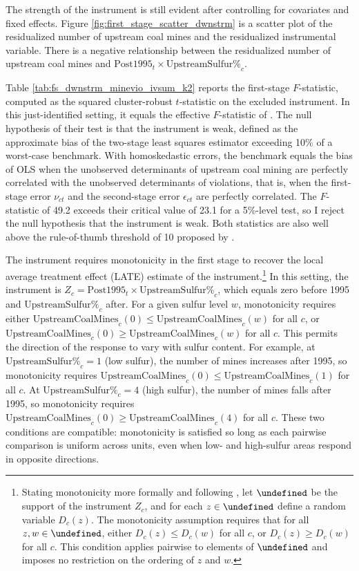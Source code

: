 \documentclass[12pt]{article}
\let\Psi\undefined
\begin{document}
The strength of the instrument is still evident after controlling for covariates and fixed effects. Figure \ref{fig:first_stage_scatter_dwnstrm} is a scatter plot of the residualized number of upstream coal mines and the residualized instrumental variable. There is a negative relationship between the residualized number of upstream coal mines and $\text{Post1995}_t \times \text{UpstreamSulfur\%}_c$.

Table \ref{tab:fs_dwnstrm_minevio_ivsum_k2} reports the first-stage $F$-statistic, computed as the squared cluster-robust $t$-statistic on the excluded instrument. In this just-identified setting, it equals the effective $F$-statistic of \textcite{montielolea2013robust}. The null hypothesis of their test is that the instrument is weak, defined as the approximate bias of the two-stage least squares estimator exceeding 10\% of a worst-case benchmark. With homoskedastic errors, the benchmark equals the bias of OLS when the unobserved determinants of upstream coal mining are perfectly correlated with the unobserved determinants of violations, that is, when the first-stage error $\nu_{ct}$ and the second-stage error $\epsilon_{ct}$ are perfectly correlated. The $F$-statistic of 49.2 exceeds their critical value of 23.1 for a 5\%-level test, so I reject the null hypothesis that the instrument is weak. Both statistics are also well above the rule-of-thumb threshold of 10 proposed by \textcite{staigerstock1997instrumental}.

The instrument requires monotonicity in the first stage to recover the local average treatment effect (LATE) estimate of the instrument.\footnote{Stating monotonicity more formally and following \textcite{angrist1994identification}, let $\Psi$ be the support of the instrument $Z_c$, and for each $z \in \Psi$ define a random variable $D_c(z)$. The monotonicity assumption requires that for all $z, w \in \Psi$, either $D_c(z) \leq D_c(w)$ for all $c$, or $D_c(z) \geq D_c(w)$ for all $c$. This condition applies pairwise to elements of $\Psi$ and imposes no restriction on the ordering of $z$ and $w$.} In this setting, the instrument is $Z_c = \text{Post1995}_t \times \text{UpstreamSulfur\%}_c$, which equals zero before 1995 and $\text{UpstreamSulfur\%}_c$ after. For a given sulfur level $w$, monotonicity requires either $\text{UpstreamCoalMines}_c(0) \leq \text{UpstreamCoalMines}_c(w)$ for all $c$, or $\text{UpstreamCoalMines}_c(0) \geq \text{UpstreamCoalMines}_c(w)$ for all $c$. This permits the direction of the response to vary with sulfur content. For example, at $\text{UpstreamSulfur\%}_c = 1$ (low sulfur), the number of mines increases after 1995, so monotonicity requires $\text{UpstreamCoalMines}_c(0) \leq \text{UpstreamCoalMines}_c(1)$ for all $c$. At $\text{UpstreamSulfur\%}_c = 4$ (high sulfur), the number of mines falls after 1995, so monotonicity requires $\text{UpstreamCoalMines}_c(0) \geq \text{UpstreamCoalMines}_c(4)$ for all $c$. These two conditions are compatible: monotonicity is satisfied so long as each pairwise comparison is uniform across units, even when low- and high-sulfur areas respond in opposite directions.
\end{document}
